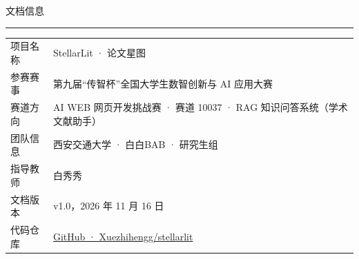 \vfill
\begingroup
\parindent=0pt
\noindent\begin{minipage}{\textwidth}
{\heiti\small 文档信息}\par
\vspace{2pt}
{\color{rule}\rule{\textwidth}{0.4pt}}\par
\vspace{2pt}
\renewcommand{\arraystretch}{1.35}
\begin{tabular}{@{}>{\raggedright\arraybackslash}p{2.8cm}>{\raggedright\arraybackslash}p{\dimexpr\textwidth-2.8cm-14pt\relax}@{}}
项目名称 & StellarLit · 论文星图 \\
参赛赛事 & 2026 第九届“传智杯”全国大学生数智创新与 AI 应用大赛 \\
赛道方向 & AI WEB 网页开发挑战赛 · 赛道 10037 · RAG 知识问答系统（学术文献助手） \\
团队信息 & 西安交通大学 · 白白BAB · 研究生组 \\
指导教师 & 白秀秀 \\
文档版本 & v1.0，2026 年 11 月 16 日 \\
代码仓库 & \href{https://github.com/Xuezhihengg/stellarlit}{GitHub · Xuezhihengg/stellarlit} \\
\end{tabular}
\end{minipage}
\endgroup

\newpage
